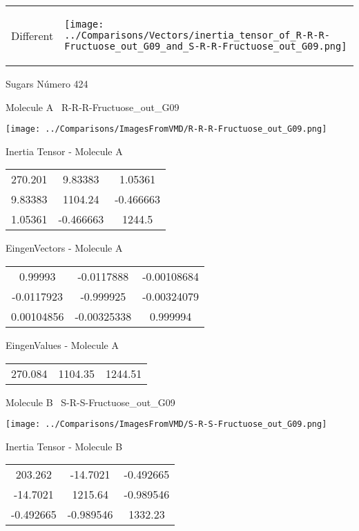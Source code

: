 \vtab[-5mm]
\begin{tabular}{*{2}{m{}}}
\begin{center}
\textcolor{NavyBlue}{\Large Different}
\end{center}
&
\begin{center}
\texttt{[image: ../Comparisons/Vectors/inertia\_tensor\_of\_R-R-R-Fructuose\_out\_G09\_and\_S-R-R-Fructuose\_out\_G09.png]}
\end{center}
\end{tabular}

 \newpage

\vtab[-3cm]
\begin{center}
{\large Sugars \tab Número 424}
\end{center}
\begin{multicols}{2}
\begin{center}

Molecule A \
R-R-R-Fructuose\_out\_G09

\texttt{[image: ../Comparisons/ImagesFromVMD/R-R-R-Fructuose\_out\_G09.png]}

Inertia Tensor - Molecule A \\
\begin{tabular}{|c c c|}
270.201	 & 	9.83383	 & 	1.05361	 \\
9.83383	 & 	1104.24	 & 	-0.466663	 \\
1.05361	 & 	-0.466663	 & 	1244.5
\end{tabular}

\vtab
 EingenVectors - Molecule A     \\
\begin{tabular}{|c c c|}
0.99993	 & 	-0.0117888	 & 	-0.00108684	 \\
-0.0117923	 & 	-0.999925	 & 	-0.00324079	 \\
0.00104856	 & 	-0.00325338	 & 	0.999994
\end{tabular}

\vtab
 EingenValues - Molecule A     \\
\begin{tabular}{|c c c|}
270.084	 & 	1104.35	 & 	1244.51	 \\
\end{tabular}
\columnbreak

Molecule B \
S-R-S-Fructuose\_out\_G09

\texttt{[image: ../Comparisons/ImagesFromVMD/S-R-S-Fructuose\_out\_G09.png]}

Inertia Tensor - Molecule B \\
\begin{tabular}{|c c c|}
203.262	 & 	-14.7021	 & 	-0.492665	 \\
-14.7021	 & 	1215.64	 & 	-0.989546	 \\
-0.492665	 & 	-0.989546	 & 	1332.23
\end{tabular}


\end{center}
\end{multicols}
